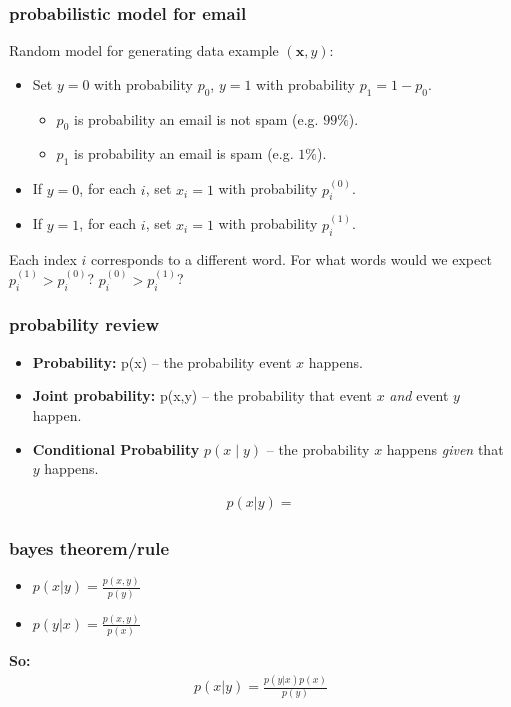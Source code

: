 \documentclass[handout,compress]{beamer}
\newcommand{\bv}[1]{\mathbf{#1}}
\begin{document}
\begin{frame}
	\frametitle{probabilistic model for email}
	Random model for generating data example $(\bv{x},y)$:
	\begin{itemize}
		\item Set $y = 0$ with probability $p_0$, $y = 1$ with probability $p_1 = 1-p_0$. 
		\begin{itemize}
			\item $p_0$ is probability an email is not spam (e.g. $99\%$). 
			\item $p_1$ is probability an email is spam (e.g. $1\%$). 
		\end{itemize}
		\item If $y=0$, for each $i$, set $x_i = 1$ with probability $p_i^{(0)}$.
		\item If $y=1$, for each $i$, set $x_i = 1$ with probability $p_i^{(1)}$.
	\end{itemize}
	Each index $i$ corresponds to a different word. For what words would we expect $p_i^{(1)} > p_i^{(0)}$? $p_i^{(0)} > p_i^{(1)}$?
\end{frame}

\begin{frame}
	\frametitle{probability review}
	\begin{itemize}
		\item \textbf{Probability:} p(x) -- the probability event $x$ happens.
		\item \textbf{Joint probability:} p(x,y) -- the probability that event $x$ \emph{and} event $y$ happen. 
		\item \textbf{Conditional Probability} $p(x \mid y)$ -- the probability $x$ happens \emph{given} that $y$ happens.
	\end{itemize}

\begin{align*}
	p(x | y) = 
\end{align*}

\end{frame}

\begin{frame}
	\frametitle{bayes theorem/rule}
	\begin{itemize}
		\item $p(x | y) = \frac{p(x,y)}{p(y)}$
		\item $p(y | x) = \frac{p(x,y)}{p(x)}$
	\end{itemize}
\textbf{So:}
\begin{align*}
	p(x | y) = \frac{p(y | x)p(x)}{p(y)}
\end{align*}
\end{frame}
\end{document}
